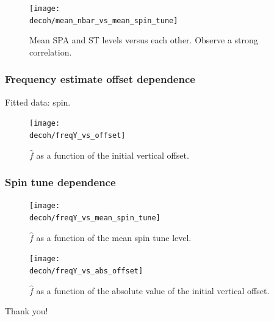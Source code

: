 \documentclass{beamer}
\newcommand{\home}{\string~}
\newcommand{\Artem}{\home/REPOS/COSYINF/img/Artem}
\newcommand{\decoh}{\Artem/decoherence_frequency_dependence}
\begin{document}
\begin{frame}
  \begin{figure}[H]
    \texttt{[image: \\decoh/mean\_nbar\_vs\_mean\_spin\_tune]}
    \caption{Mean SPA and ST levels versus each other. Observe a strong correlation.\label{fig:mean_tune_axis}}
  \end{figure}
\end{frame}

\begin{frame}\frametitle{Frequency estimate offset dependence}
  Fitted data: spin.
  \begin{figure}[H]
    \centering
    \texttt{[image: \\decoh/freqY\_vs\_offset]}
    \caption{$\hat f$ as a function of the initial vertical offset.}
  \end{figure}
\end{frame}

\begin{frame}\frametitle{Spin tune dependence}
  \begin{figure}[H]
    \texttt{[image: \\decoh/freqY\_vs\_mean\_spin\_tune]}
    \caption{$\hat f$ as a function of the mean spin tune level.}
  \end{figure}
\end{frame}

\begin{frame}
  \begin{figure}[H]
    \texttt{[image: \\decoh/freqY\_vs\_abs\_offset]}
    \caption{$\hat f$ as a function of the absolute value of the initial vertical offset.}
  \end{figure}
\end{frame}

\begin{frame}
  \begin{center}
    Thank you!
  \end{center}
\end{frame}
\end{document}
